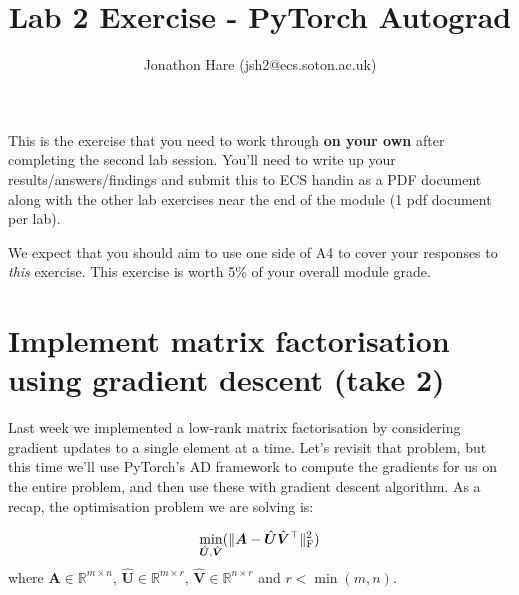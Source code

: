 \documentclass[a4paper]{article}
\begin{document}
\lstset{language=Python,upquote=true}

\setlength{\leftskip}{20pt}
\title{Lab 2 Exercise - PyTorch Autograd}
\author{Jonathon Hare (jsh2@ecs.soton.ac.uk)}

\maketitle


This is the exercise that you need to work through \textbf{on your own} after completing the second lab session. You'll need to write up your results/answers/findings and submit this to ECS handin as a PDF document along with the other lab exercises near the end of the module (1 pdf document per lab). 

We expect that you should aim to use one side of A4 to cover your responses to \emph{this} exercise. This exercise is worth 5\% of your overall module grade.

\section{Implement matrix factorisation using gradient descent (take 2)}\label{gd}

Last week we implemented a low-rank matrix factorisation by considering gradient updates to a single element at a time. Let's revisit that problem, but this time we'll use PyTorch's AD framework to compute the gradients for us on the entire problem, and then use these with gradient descent algorithm. As a recap, the optimisation problem we are solving is:

\begin{equation}
	\min\limits_{\hat{\bm U}, \hat{\bm V}}( \| \bm A - \hat{\bm U}\hat{\bm V}^\top \|_{\rm F}^2 )
\end{equation}
where $\bm A \in \mathbb{R}^{m \times n}$, $\hat{\bm U} \in \mathbb{R}^{m \times r}$, $\hat{\bm V} \in \mathbb{R}^{n \times r}$ and $r<\min(m,n)$. 
\end{document}
